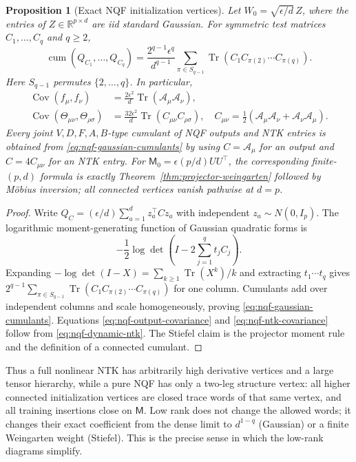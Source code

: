 \documentclass{article}
\newtheorem{proposition}[theorem]{Proposition}
\newcommand{\R}{\mathbb R}
\newcommand{\Cov}{\operatorname{Cov}}
\newcommand{\cum}{\operatorname{cum}}
\newcommand{\Tr}{\operatorname{Tr}}
\begin{document}
\begin{proposition}[Exact NQF initialization vertices]
\label{prop:nqf-all-valence}
Let \(W_0=\sqrt{\epsilon/d}\,Z\), where the entries of
\(Z\in\R^{p\times d}\) are iid standard Gaussian.  For symmetric test
matrices \(C_1,\ldots,C_q\) and \(q\ge2\),
\begin{equation}
\cum(Q_{C_1},\ldots,Q_{C_q})
=\frac{2^{q-1}\epsilon^q}{d^{q-1}}
\sum_{\pi\in S_{q-1}}
\Tr(C_1C_{\pi(2)}\cdots C_{\pi(q)}).
\label{eq:nqf-gaussian-cumulants}
\end{equation}
Here \(S_{q-1}\) permutes \(\{2,\ldots,q\}\).  In particular,
\begin{align}
\Cov(f_\mu,f_\nu)
&=\frac{2\epsilon^2}{d}\Tr(\mathscr A_\mu\mathscr A_\nu),
\label{eq:nqf-output-covariance}\\
\Cov(\Theta_{\mu\nu},\Theta_{\rho\sigma})
&=\frac{32\epsilon^2}{d}
\Tr(C_{\mu\nu}C_{\rho\sigma}),
\quad
C_{\mu\nu}=\frac12(\mathscr A_\mu\mathscr A_\nu
+\mathscr A_\nu\mathscr A_\mu).
\label{eq:nqf-ntk-covariance}
\end{align}
Every joint \(V,D,F,A,B\)-type cumulant of NQF outputs and NTK entries is
obtained from \eqref{eq:nqf-gaussian-cumulants} by using
\(C=\mathscr A_\mu\) for an output and \(C=4C_{\mu\nu}\) for an NTK entry.
For \(\mathsf M_0=\epsilon(p/d)UU^\top\), the corresponding finite-
\((p,d)\) formula is exactly Theorem~\ref{thm:projector-weingarten} followed
by M\"obius inversion; all connected vertices vanish pathwise at \(d=p\).
\end{proposition}

\begin{proof}
Write \(Q_C=(\epsilon/d)\sum_{a=1}^d z_a^\top Cz_a\) with independent
\(z_a\sim N(0,I_p)\).  The logarithmic moment-generating function of
Gaussian quadratic forms is
\begin{equation*}
-\frac12\log\det\left(I-2\sum_{j=1}^qt_jC_j\right).
\end{equation*}
Expanding \(-\log\det(I-X)=\sum_{k\ge1}\Tr(X^k)/k\) and extracting
\(t_1\cdots t_q\) gives
\(2^{q-1}\sum_{\pi\in S_{q-1}}
\Tr(C_1C_{\pi(2)}\cdots C_{\pi(q)})\) for one column.  Cumulants add over
independent columns and scale homogeneously, proving
\eqref{eq:nqf-gaussian-cumulants}.  Equations
\eqref{eq:nqf-output-covariance} and
\eqref{eq:nqf-ntk-covariance} follow from
\eqref{eq:nqf-dynamic-ntk}.  The Stiefel claim is the projector moment rule
and the definition of a connected cumulant.
\end{proof}

Thus a full nonlinear NTK has arbitrarily high derivative vertices and a
large tensor hierarchy, while a pure NQF has only a two-leg structure vertex:
all higher connected initialization vertices are closed trace words of that
same vertex, and all training insertions close on \(\mathsf M\).  Low rank
does not change the allowed words; it changes their exact coefficient from
the dense limit to \(d^{1-q}\) (Gaussian) or a finite Weingarten weight
(Stiefel).  This is the precise sense in which the low-rank diagrams
simplify.
\end{document}
